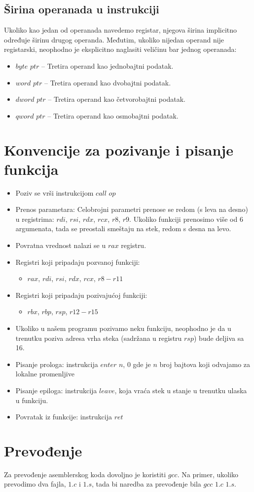 \documentclass[a4paper, 10pt]{article}
\begin{document}
\subsection{Širina operanada u instrukciji}
Ukoliko kao jedan od operanada navedemo registar, njegova širina implicitno određuje širinu drugog operanda. Međutim, ukoliko nijedan operand nije registarski, neophodno je eksplicitno naglasiti veličinu bar jednog operanada:
	\begin{itemize}
		\item $byte$ $ptr$ -- Tretira operand kao jednobajtni podatak.
		\item $word$ $ptr$ -- Tretira operand kao dvobajtni podatak.
		\item $dword$ $ptr$ -- Tretira operand kao četvorobajtni podatak.
		\item $qword$ $ptr$ -- Tretira operand kao osmobajtni podatak.
	\end{itemize}
\section{Konvencije za pozivanje i pisanje funkcija}
\begin{itemize}
\item Poziv se vrši instrukcijom $call$ $op$
	\item Prenos parametara: Celobrojni parametri prenose se redom (s leva na desno) u registrima: $rdi$, $rsi$, $rdx$, $rcx$, $r8$, $r9$. Ukoliko funkciji prenosimo više od 6 argumenata, tada se preostali smeštaju na stek, redom s desna na levo.
	\item Povratna vrednost nalazi se u $rax$ registru.
	\item Registri koji pripadaju pozvanoj funkciji:
		\begin{itemize}
			\item $rax$, $rdi$, $rsi$, $rdx$, $rcx$, $r8-r11$
		\end{itemize}
	\item Registri koji pripadaju pozivajućoj funkciji:
		\begin{itemize}
			\item $rbx$, $rbp$, $rsp$, $r12-r15$
		\end{itemize}
	\item Ukoliko u našem programu pozivamo neku funkciju, neophodno je da u trenutku poziva adresa vrha steka (sadržana u registru $rsp$) bude deljiva sa 16.
	\item Pisanje prologa: instrukcija $enter$ $n$, $0$ gde je $n$ broj bajtova koji odvajamo za lokalne promenljive
	\item Pisanje epiloga: instrukcija $leave$, koja vraća stek u stanje u trenutku ulaska u funkciju.
	\item Povratak iz funkcije: instrukcija $ret$
\end{itemize}
	
\section{Prevođenje}
Za prevođenje asemblerskog koda dovoljno je koristiti $gcc$. Na primer, ukoliko prevodimo dva fajla, $1.c$ i $1.s$, tada bi naredba za prevođenje bila $gcc$ $1.c$ $1.s$.
\end{document}
